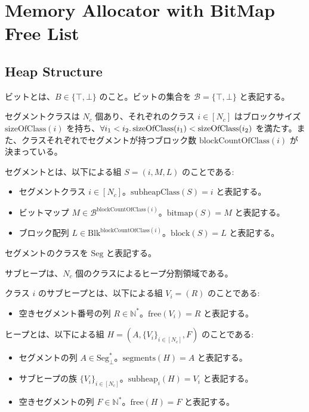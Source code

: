 \section{Memory Allocator with BitMap Free List}

\cite{Ueno:2011}\cite{Ueno:2016}

\subsection{Heap Structure}

\begin{definition}
  ビットとは、$B \in \{\top, \bot\}$ のこと。ビットの集合を $\mathcal{B} = \{\top, \bot\}$ と表記する。
\end{definition}

セグメントクラスは $N_c$ 個あり、それぞれのクラス $i \in [N_c]$ はブロックサイズ $\mathrm{sizeOfClass}(i)$ を持ち、$\forall i_1 < i_2\ldotp \mathrm{sizeOfClass}(i_1) < \mathrm{sizeOfClass}(i_2)$ を満たす。また、クラスそれぞれでセグメントが持つブロック数 $\mathrm{blockCountOfClass}(i)$ が決まっている。
\begin{definition}
  セグメントとは、以下による組 $S = (i, M, L)$ のことである:
  \begin{itemize}
    \item セグメントクラス $i \in [N_c]$。$\mathrm{subheapClass}(S) = i$ と表記する。
    \item ビットマップ $M \in \mathcal{B}^{\mathrm{blockCountOfClass}(i)}$。$\mathrm{bitmap}(S) = M$ と表記する。
    \item ブロック配列 $L \in \mathrm{Blk}^{\mathrm{blockCountOfClass}(i)}$。$\mathrm{block}(S) = L$ と表記する。
  \end{itemize}
  セグメントのクラスを $\mathrm{Seg}$ と表記する。
\end{definition}

サブヒープは、$N_c$ 個のクラスによるヒープ分割領域である。
\begin{definition}
  クラス $i$ のサブヒープとは、以下による組 $V_i = (R)$ のことである:
  \begin{itemize}
    \item 空きセグメント番号の列 $R \in \mathbb{N}^*$。$\mathrm{free}(V_i) = R$ と表記する。
  \end{itemize}
\end{definition}

\begin{definition}
  ヒープとは、以下による組 $H = (A, \{V_i\}_{i \in [N_c]}, F)$ のことである:
  \begin{itemize}
    \item セグメントの列 $A \in \mathrm{Seg}_\bot^*$。$\mathrm{segments}(H) = A$ と表記する。
    \item サブヒープの族 $\{V_i\}_{i \in [N_c]}$。$\mathrm{subheap}_i(H) = V_i$ と表記する。
    \item 空きセグメントの列 $F \in \mathbb{N}^*$。$\mathrm{free}(H) = F$ と表記する。
  \end{itemize}
\end{definition}

